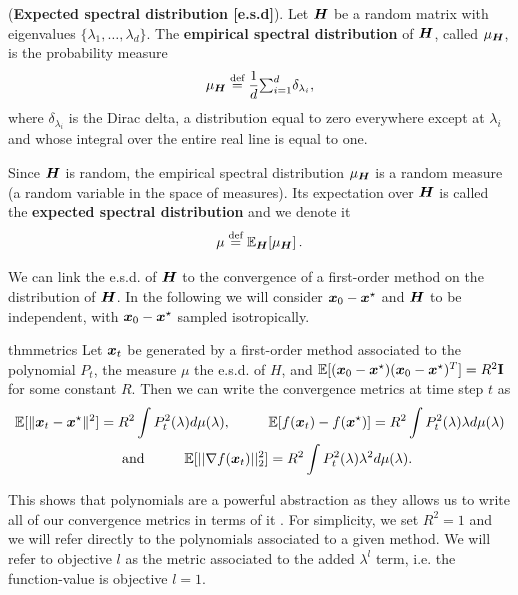 \documentclass{article}
\begin{document}
\begin{definition}
(\textbf{Expected spectral distribution [e.s.d]}). 
Let ${\boldsymbol H}$ be a random matrix with eigenvalues $\{\lambda_1, \ldots, \lambda_d\}$. The \textbf{empirical spectral distribution} of ${\boldsymbol H}$, called ${\mu}_{{\boldsymbol H}}$, is the probability measure
\begin{equation}\label{eq:wighted_spectral_density}
    \mu_{{\boldsymbol H}} \stackrel{\text{def}}{=} \frac{1}{d}{\textstyle{\sum_{i=1}^d}} \delta_{\lambda_i},
\end{equation}
where $\delta_{\lambda_i}$ is the Dirac delta, a distribution equal to zero everywhere except at $\lambda_i$ and whose integral over the entire real line is equal to one.

Since ${\boldsymbol H}$ is random, the empirical spectral distribution $\mu_{\boldsymbol H}$ is a random measure (a random variable in the space of measures). Its expectation over ${\boldsymbol H}$ is called the \textbf{expected spectral distribution} and we denote it
\begin{equation}
\mu \stackrel{\text{def}}{=} {\mathbb{E}}_{{\boldsymbol H}}[\mu_{{\boldsymbol H}}]\,.
\end{equation}
\end{definition}

We can link the e.s.d. of ${\boldsymbol H}$ to the convergence of a first-order method on the distribution of ${\boldsymbol H}$. In the following we will consider ${\boldsymbol x}_0-{\boldsymbol x}^\star$ and ${\boldsymbol H}$ to be independent, with ${\boldsymbol x}_0-{\boldsymbol x}^\star$ sampled isotropically. %

\begin{restatable}{thm}{metrics} \label{thm: metrics}
Let ${\boldsymbol x}_t$ be generated by a first-order method associated to the polynomial $P_t$, the measure $\mu$ the  e.s.d. of $H$, and $\mathbb{E}[({\boldsymbol x}_0-{\boldsymbol x}^\star)({\boldsymbol x}_0-{\boldsymbol x}^\star)^T]=R^2\textbf{I}$ for some constant $R$. Then we can write the convergence metrics at time step  $t$ as
\begin{equation}
\begin{split}
\label{eq:error_norm_x}
  \mathbb{E}[\|{\boldsymbol x}_t-{\boldsymbol x}^\star\|^2] = { R^2} \int {P_t^2(\lambda) d\mu(\lambda)}, \hspace{1 cm}
    &\mathbb{E}[f({\boldsymbol x}_t)-f({\boldsymbol x}^\star)]=R^2\int P_t^2(\lambda)\lambda d\mu(\lambda)\\
    \text{and} \hspace{1 cm} \mathbb{E}[||\nabla f({\boldsymbol x}_t)||^2_2]&=R^2\int P_t^2(\lambda)\lambda^2d\mu(\lambda) .
\end{split}
\end{equation}
\end{restatable}
This shows that polynomials are a powerful abstraction as they allows us to write all of our convergence metrics in terms of it . For simplicity, we set $R^2 = 1$ and we will refer directly to the polynomials associated to a given method. We will refer to objective $l$ as the metric associated to the added $\lambda^l$ term, i.e. the function-value is objective $l=1$.
\end{document}
